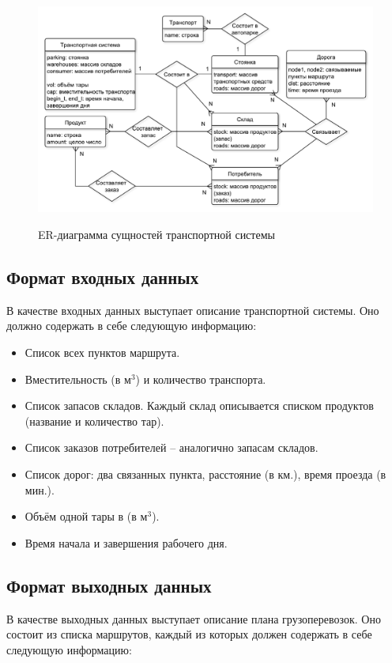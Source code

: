 \begin{figure}[h]
	\begin{center}
		{\includegraphics[scale=0.65, angle=0, page=1]{img/ER.pdf}}
		\caption{ER-диаграмма сущностей транспортной системы}
		\label{ER}
	\end{center}
\end{figure}

\subsection{Формат входных данных}
В качестве входных данных выступает описание транспортной системы. Оно должно содержать в себе следующую информацию:

\begin{itemize}
	\item Список всех пунктов маршрута.
	\item Вместительность (в м$^3$) и количество транспорта.
	\item Список запасов складов. Каждый склад описывается списком продуктов (название и количество тар).
	\item Список заказов потребителей -- аналогично запасам складов.
	\item Список дорог: два связанных пункта, расстояние (в км.), время проезда (в мин.).
	\item Объём одной тары в (в м$^3$).
	\item Время начала и завершения рабочего дня.
\end{itemize}

\subsection{Формат выходных данных}
В качестве выходных данных выступает описание плана грузоперевозок. Оно состоит из списка маршрутов, каждый из которых должен содержать в себе следующую информацию:

